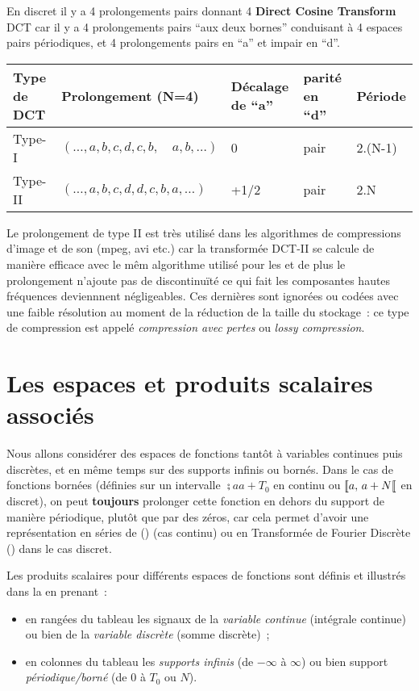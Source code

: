 \begin{remarque}
En discret il y a 4 prolongements pairs donnant 4 \textbf{Direct Cosine
Transform} DCT car il y a 4 prolongements pairs ``aux deux bornes'' conduisant à 4
espaces pairs périodiques, et 4 prolongements pairs en ``a'' et impair en
``d''.

\begin{tabular}{lllll}
\hline
  Type de DCT & Prolongement (N=4) & Décalage de ``a'' & parité en ``d'' &
Période \\
\hline
Type-I & $(\ldots, a, b, c, d, c, b, \quad a, b, \ldots)$ & 0 & pair & 2.(N-1) \\
Type-II & $(\dots, a, b, c, d, d, c, b, a,\dots)$ & +1/2 & pair & 2.N \\
\hline
\end{tabular}

Le prolongement de type II est très utilisé dans les algorithmes de
compressions d'image et de son (mpeg, avi etc.) car la transformée
DCT-II se calcule de manière efficace avec le mêm algorithme \FFT{}
utilisé pour les \TFD{} et de plus le prolongement n'ajoute pas de
discontinuïté ce qui fait les composantes hautes fréquences
deviennnent négligeables. Ces dernières sont ignorées ou codées avec
une faible résolution au moment de la réduction de la taille du
stockage~: ce type de compression est appelé \emph{compression avec
  pertes} ou \emph{lossy compression}.
\end{remarque}




\section{Les espaces et produits scalaires associés}
Nous allons considérer des espaces de fonctions tantôt à variables
continues puis discrètes, et en même temps sur des supports infinis ou
bornés. Dans le cas de fonctions bornées (définies sur un intervalle $\semi{a}{a+T_0}$ en continu ou ${[\![ a,\,a+N[\![}$ en discret), on peut \textbf{toujours} prolonger cette fonction
en dehors du support de manière périodique, plutôt que par des zéros, car cela permet d'avoir une représentation en séries de \Fourier{} (\sdf{}) (cas continu) ou en Transformée de Fourier Discrète (\TFD{}) dans le cas discret.

Les produits scalaires pour différents espaces de fonctions sont définis et illustrés dans la  en prenant~:
\begin{itemize}
\item  en rangées du tableau les signaux de la \emph{variable continue} (intégrale continue) ou bien de la \emph{variable discrète} (somme discrète)~;
\item en colonnes du tableau les \emph{supports infinis} (de $-\infty$ à $\infty$) ou bien support \emph{périodique/borné} (de $0$ à $T_0$ ou $N$).
\end{itemize}

